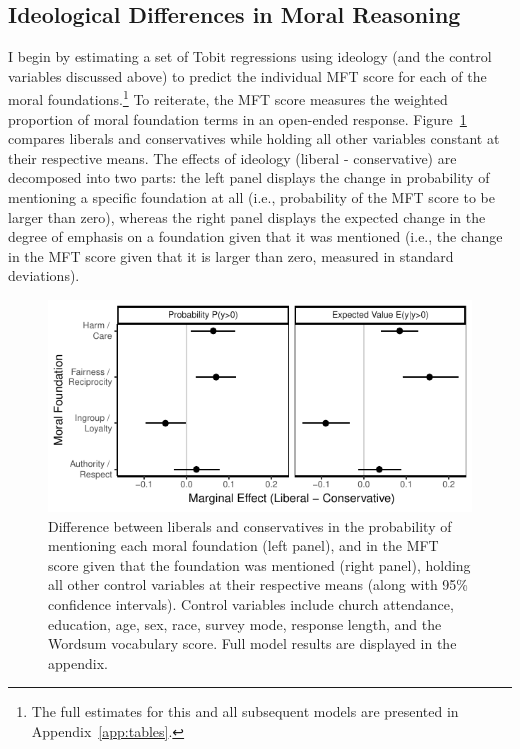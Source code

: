 \documentclass[12pt]{article}
\begin{document}


\subsection*{Ideological Differences in Moral Reasoning}

I begin by estimating a set of Tobit regressions using ideology (and the control variables discussed above) to predict the individual MFT score for each of the moral foundations.\footnote{The full estimates for this and all subsequent models are presented in Appendix~\ref{app:tables}.} To reiterate, the MFT score measures the weighted proportion of moral foundation terms in an open-ended response. Figure~\ref{fig:tobit_ideol} compares liberals and conservatives while holding all other variables constant at their respective means. The effects of ideology (liberal - conservative) are decomposed into two parts: the left panel displays the change in probability of mentioning a specific foundation at all (i.e., probability of the MFT score to be larger than zero), whereas the right panel displays the expected change in the degree of emphasis on a foundation given that it was mentioned  (i.e., the change in the MFT score given that it is larger than zero, measured in standard deviations).

\begin{figure}[ht]\centering
\includegraphics{../calc/fig/tobit_ideol.pdf}
\caption{Difference between liberals and conservatives in the probability of mentioning each moral foundation (left panel), and in the MFT score given that the foundation was mentioned (right panel), holding all other control variables at their respective means (along with 95\% confidence intervals). Control variables include church attendance, education, age, sex, race, survey mode, response length, and the Wordsum vocabulary score. Full model results are displayed in the appendix.
}\label{fig:tobit_ideol}
\end{figure}
\end{document}
